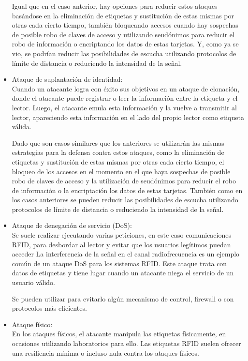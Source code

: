 \documentclass[12pt,a4paper,onecolumn,oneside]{report}
\begin{document}
\begin{itemize}
Igual que en el caso anterior, hay opciones para reducir estos ataques basándose en la eliminación de etiquetas y sustitución de estas mismas por otras cada cierto tiempo, también bloqueando accesos cuando hay sospechas de posible robo de claves de acceso y utilizando seudónimos para reducir el robo de información o encriptando los datos de estas tarjetas. Y, como ya se vio, se podrían reducir las posibilidades de escucha utilizando protocolos de límite de distancia o reduciendo la intensidad de la señal.

\item Ataque de suplantación de identidad:\\
Cuando un atacante logra con éxito sus objetivos en un ataque de clonación, donde el atacante puede registrar o leer la información entre la etiqueta y el lector. Luego, el atacante emula esta información y la vuelve a transmitir al lector, apareciendo esta información en el lado del propio lector como etiqueta válida.

Dado que son casos similares que los anteriores se utilizarán las mismas estrategias para la defensa contra estos ataques, como la eliminación de etiquetas y sustitución de estas mismas por otras cada cierto tiempo, el bloqueo de los accesos en el momento en el que haya sospechas de posible robo de claves de acceso y la utilización de seudónimos para reducir el robo de información o la encriptación los datos de estas tarjetas. También como en los casos anteriores se pueden reducir las posibilidades de escucha utilizando protocolos de límite de distancia o reduciendo la intensidad de la señal.

\item Ataque de denegación de servicio (DoS):\\
Se suele realizar ejecutando varias peticiones, en este caso comunicaciones RFID, para desbordar al lector y evitar que los usuarios legítimos puedan acceder La interferencia de la señal en el canal radiofrecuencia es un ejemplo común de un ataque DoS para los sistemas RFID. Este ataque trata con datos de etiquetas y tiene lugar cuando un atacante niega el servicio de un usuario válido.

Se pueden utilizar para evitarlo algún mecanismo de control, firewall o con protocolos más eficientes.

\item Ataque físico:\\
En los ataques físicos, el atacante manipula las etiquetas físicamente, en ocasiones utilizando laboratorios para ello. Las etiquetas RFID suelen ofrecer una resiliencia mínima o incluso nula contra los ataques físicos. 


\end{itemize}
\end{document}
